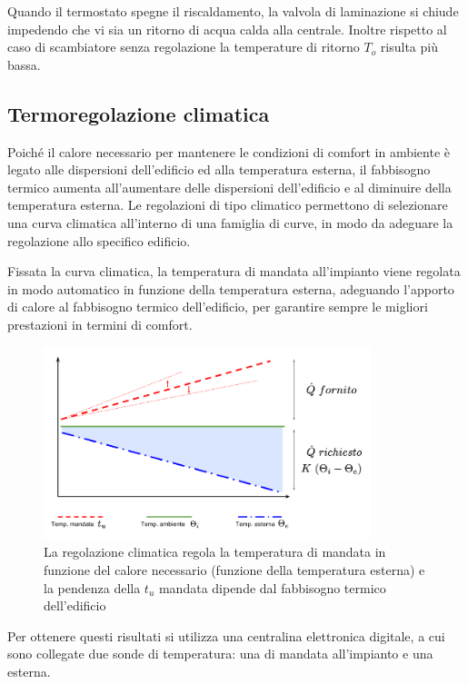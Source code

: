 \documentclass[laurea,oneside,11pt]{USiena_tesiLM}
\begin{document}
Quando il termostato spegne il riscaldamento, la valvola di laminazione si chiude impedendo che vi sia un ritorno di acqua calda alla centrale. Inoltre rispetto al caso di scambiatore senza regolazione la temperature di ritorno $T_o$ risulta più bassa.


\subsection{Termoregolazione climatica}
Poiché il calore necessario per mantenere le condizioni di comfort in ambiente è legato alle dispersioni dell'edificio ed alla temperatura esterna, il fabbisogno termico aumenta all'aumentare delle dispersioni dell'edificio e al diminuire della temperatura esterna. Le regolazioni di tipo climatico permettono di selezionare una curva climatica all'interno di una famiglia di curve, in modo da adeguare la regolazione allo specifico edificio. 

Fissata la curva climatica, la temperatura di mandata all'impianto viene regolata in modo automatico in funzione della temperatura esterna, adeguando l'apporto di calore al fabbisogno termico dell'edificio, per garantire sempre le migliori prestazioni in termini di comfort. 

\begin{figure}[!ht]
\centering
\includegraphics[width=0.85\textwidth]{figure/climatica} 
\caption{La regolazione climatica regola la temperatura di mandata in funzione del calore necessario (funzione della temperatura esterna) e la pendenza della $t_u$ mandata dipende dal fabbisogno termico dell'edificio}
\label{fig:surplus}
\end{figure}

Per ottenere questi risultati si utilizza una centralina elettronica digitale, a cui sono collegate due sonde di temperatura: una di mandata all'impianto e una esterna. 
\end{document}
